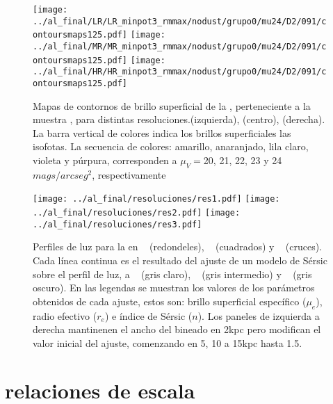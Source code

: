 \begin{figure}[H]
 \hspace*{-1.4cm}\texttt{[image: ../al\_final/LR/LR\_minpot3\_rmmax/nodust/grupo0/mu24/D2/091/contoursmaps125.pdf]}
  \hspace*{-.1cm}\texttt{[image: ../al\_final/MR/MR\_minpot3\_rmmax/nodust/grupo0/mu24/D2/091/contoursmaps125.pdf]}
  \hspace*{-.1cm}\texttt{[image: ../al\_final/HR/HR\_minpot3\_rmmax/nodust/grupo0/mu24/D2/091/contoursmaps125.pdf]}
\caption{Mapas de contornos de brillo superficial de la , perteneciente a la muestra \cmen, para distintas resoluciones.\lr (izquierda), \mr (centro), \hr(derecha).
La barra vertical de colores indica los brillos superficiales las isofotas. 
La secuencia de colores: amarillo, anaranjado, lila claro, violeta y  p\'urpura, corresponden a $\mu_{V}= $20, 21, 22, 23 y 24 $mags/arcseg^{2}$, respectivamente}
\label{fig:isofotas}
\end{figure}


\begin{figure}[H]
  \hspace*{-1.4cm}\texttt{[image: ../al\_final/resoluciones/res1.pdf]}
  \hspace*{.1cm}\texttt{[image: ../al\_final/resoluciones/res2.pdf]}
  \hspace*{.1cm}\texttt{[image: ../al\_final/resoluciones/res3.pdf]}
\caption{Perfiles de luz para la  en \lr~ (redondeles), \mr~ (cuadrados) y \hr~ (cruces).
Cada l\'inea continua es el resultado del ajuste de un modelo de S\'ersic sobre el perfil de luz, a \lr~ (gris claro), \mr~ (gris intermedio) y \hr~ (gris oscuro). En las legendas 
se muestran los valores de los par\'ametros obtenidos de cada ajuste, estos son: brillo superficial espec\'ifico ($\mu_{e}$), radio efectivo ($r_{e}$) e \'indice de S\'ersic ($n$).
Los paneles de izquierda a derecha mantinenen el ancho del bineado en 2kpc pero modifican el valor inicial del ajuste, comenzando en 5, 10 a 15kpc hasta 1.5\rvc.}
\label{fig:resoluciones}
\end{figure}

\section{relaciones de escala}



